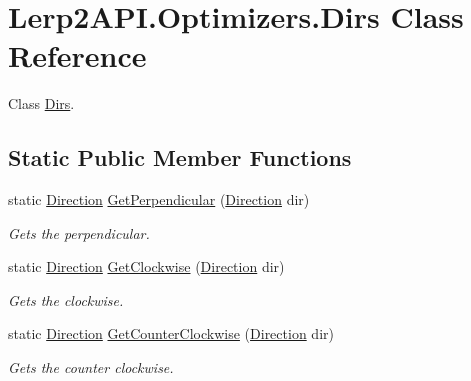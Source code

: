 \hypertarget{class_lerp2_a_p_i_1_1_optimizers_1_1_dirs}{}\section{Lerp2\+A\+P\+I.\+Optimizers.\+Dirs Class Reference}
\label{class_lerp2_a_p_i_1_1_optimizers_1_1_dirs}


Class \hyperlink{class_lerp2_a_p_i_1_1_optimizers_1_1_dirs}{Dirs}.  


\subsection*{Static Public Member Functions}
\begin{DoxyCompactItemize}
\item 
static \hyperlink{namespace_lerp2_a_p_i_1_1_optimizers_a159a6f85bec1076b8b34d5da86c7cafe}{Direction} \hyperlink{class_lerp2_a_p_i_1_1_optimizers_1_1_dirs_ac5405654ae96ef91b434fd2d28c555c0}{Get\+Perpendicular} (\hyperlink{namespace_lerp2_a_p_i_1_1_optimizers_a159a6f85bec1076b8b34d5da86c7cafe}{Direction} dir)
\begin{DoxyCompactList}\small\item\em Gets the perpendicular. \end{DoxyCompactList}\item 
static \hyperlink{namespace_lerp2_a_p_i_1_1_optimizers_a159a6f85bec1076b8b34d5da86c7cafe}{Direction} \hyperlink{class_lerp2_a_p_i_1_1_optimizers_1_1_dirs_a9737770f69132bccb97e85e7424cb783}{Get\+Clockwise} (\hyperlink{namespace_lerp2_a_p_i_1_1_optimizers_a159a6f85bec1076b8b34d5da86c7cafe}{Direction} dir)
\begin{DoxyCompactList}\small\item\em Gets the clockwise. \end{DoxyCompactList}\item 
static \hyperlink{namespace_lerp2_a_p_i_1_1_optimizers_a159a6f85bec1076b8b34d5da86c7cafe}{Direction} \hyperlink{class_lerp2_a_p_i_1_1_optimizers_1_1_dirs_a159b07530e6726e2375b4850448ffd90}{Get\+Counter\+Clockwise} (\hyperlink{namespace_lerp2_a_p_i_1_1_optimizers_a159a6f85bec1076b8b34d5da86c7cafe}{Direction} dir)
\begin{DoxyCompactList}\small\item\em Gets the counter clockwise. \end{DoxyCompactList}\end{DoxyCompactItemize}


